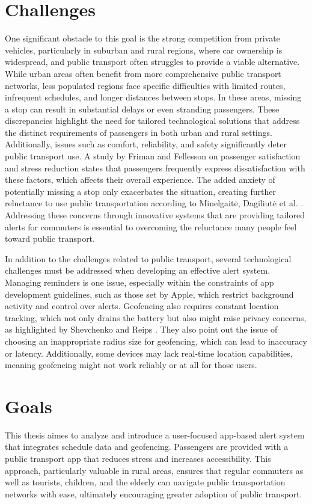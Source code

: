 \section{Challenges}
One significant obstacle to this goal is the strong competition from private vehicles, particularly in suburban and rural regions, where car ownership is widespread, and public transport often struggles to provide a viable alternative. While urban areas often benefit from more comprehensive public transport networks, less populated regions face specific difficulties with limited routes, infrequent schedules, and longer distances between stops. In these areas, missing a stop can result in substantial delays or even stranding passengers. These discrepancies highlight the need for tailored technological solutions that address the distinct requirements of passengers in both urban and rural settings. Additionally, issues such as comfort, reliability, and safety significantly deter public transport use. A study by Friman and Fellesson \cite{friman2009satisfaction} on passenger satisfaction and stress reduction states that passengers frequently express dissatisfaction with these factors, which affects their overall experience. The added anxiety of potentially missing a stop only exacerbates the situation, creating further reluctance to use public transportation according to Minelgait\.{e}, Dagiliut\.{e} et al. \cite{minelgaitė2020sustainability}. Addressing these concerns through innovative systems that are providing tailored alerts for commuters is essential to overcoming the reluctance many people feel toward public transport.

In addition to the challenges related to public transport, several technological challenges must be addressed when developing an effective alert system. Managing reminders is one issue, especially within the constraints of app development guidelines, such as those set by Apple, which restrict background activity and control over alerts. Geofencing also requires constant location tracking, which not only drains the battery but also might raise privacy concerns, as highlighted by Shevchenko and Reips \cite{shevchenko2024geofencing}. They also point out the issue of choosing an inappropriate radius size for geofencing, which can lead to inaccuracy or latency. Additionally, some devices may lack real-time location capabilities, meaning geofencing might not work reliably or at all for those users.

\section{Goals} 
This thesis aimes to analyze and introduce a user-focused app-based alert system that integrates schedule data and geofencing. Passengers are provided with a public transport app that reduces stress and increases accessibility. This approach, particularly valuable in rural areas, ensures that regular commuters as well as tourists, children, and the elderly can navigate public transportation networks with ease, ultimately encouraging greater adoption of public transport.

